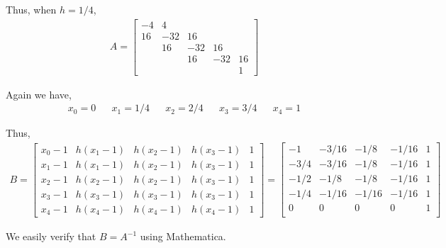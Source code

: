 \documentclass[10pt]{article}
\begin{document}
\begin{solution}[Solution]
\begin{enumerate}
       Thus, when \( h=1/4 \),
        \begin{align*}
            A = 
            \left[\begin{array}{rrrrr}
                -4 & 4  \\
                16 & -32 & 16 \\
                & 16 & -32 & 16 \\
                && 16 & -32 & 16 \\
                &&&&  1
            \end{array}\right]
        \end{align*}

        Again we have,
        \begin{align*}
            x_0 = 0 && x_1 = 1/4 && x_2 = 2/4 && x_3 = 3/4 && x_4 = 1
        \end{align*}
       

        Thus,
        \begin{align*}
            B = 
            \left[\begin{array}{rrrrr}
                x_0-1 & h(x_1-1) & h(x_2-1) & h(x_3-1) & 1 \\
                x_1-1 & h(x_1-1) & h(x_2-1) & h(x_3-1) & 1 \\
                x_2-1 & h(x_2-1) & h(x_2-1) & h(x_3-1) & 1 \\
                x_3-1 & h(x_3-1) & h(x_3-1) & h(x_3-1) & 1 \\
                x_4-1 & h(x_4-1) & h(x_4-1) & h(x_4-1) & 1
            \end{array}\right]
            =
            \left[\begin{array}{rrrrr}
                -1   & -3/16 & -1/8  & -1/16 & 1 \\
                -3/4 & -3/16 & -1/8  & -1/16 & 1 \\
                -1/2 & -1/8  & -1/8  & -1/16 & 1 \\
                -1/4 & -1/16 & -1/16 & -1/16 & 1 \\
                0    & 0     & 0     & 0     & 1 \\
            \end{array}\right]
        \end{align*}

        We easily verify that \( B=A^{-1} \) using Mathematica.

\end{enumerate}


\end{solution}
\end{document}
